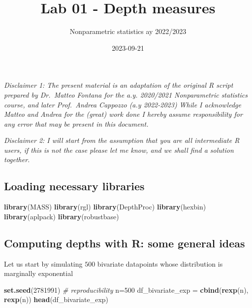 \documentclass[
]{article}
\title{Lab 01 - Depth measures}
\author{Nonparametric statistics ay 2022/2023}
\date{2023-09-21}
\newenvironment{Shaded}{\begin{snugshade}}{\end{snugshade}}
\newcommand{\CommentTok}[1]{\textcolor[rgb]{0.56,0.35,0.01}{\textit{#1}}}
\newcommand{\DecValTok}[1]{\textcolor[rgb]{0.00,0.00,0.81}{#1}}
\newcommand{\FunctionTok}[1]{\textcolor[rgb]{0.13,0.29,0.53}{\textbf{#1}}}
\newcommand{\NormalTok}[1]{#1}
\newcommand{\OtherTok}[1]{\textcolor[rgb]{0.56,0.35,0.01}{#1}}
\begin{document}
\maketitle

\emph{Disclaimer 1: The present material is an adaptation of the
original R script prepared by Dr.~Matteo Fontana for the a.y. 2020/2021
Nonparametric statistics course, and later Prof.~Andrea Cappozzo (a.y
2022-2023) While I acknowledge Matteo and Andrea for the (great) work
done I hereby assume responsibility for any error that may be present in
this document.}

\emph{Disclaimer 2: I will start from the assumption that you are all
intermediate R users, if this is not the case please let me know, and we
shall find a solution together.}

\hypertarget{loading-necessary-libraries}{%
\subsection{Loading necessary
libraries}\label{loading-necessary-libraries}}

\begin{Shaded}
\begin{Highlighting}[]
\FunctionTok{library}\NormalTok{(MASS)}
\FunctionTok{library}\NormalTok{(rgl)}
\FunctionTok{library}\NormalTok{(DepthProc)}
\FunctionTok{library}\NormalTok{(hexbin)}
\FunctionTok{library}\NormalTok{(aplpack)}
\FunctionTok{library}\NormalTok{(robustbase)}
\end{Highlighting}
\end{Shaded}

\hypertarget{computing-depths-with-r-some-general-ideas}{%
\subsection{Computing depths with R: some general
ideas}\label{computing-depths-with-r-some-general-ideas}}

Let us start by simulating \(500\) bivariate datapoints whose
distribution is marginally exponential

\begin{Shaded}
\begin{Highlighting}[]
\FunctionTok{set.seed}\NormalTok{(}\DecValTok{2781991}\NormalTok{) }\CommentTok{\# reproducibility}
\NormalTok{n}\OtherTok{=}\DecValTok{500}
\NormalTok{df\_bivariate\_exp }\OtherTok{=} \FunctionTok{cbind}\NormalTok{(}\FunctionTok{rexp}\NormalTok{(n), }\FunctionTok{rexp}\NormalTok{(n))}
\FunctionTok{head}\NormalTok{(df\_bivariate\_exp)}
\end{Highlighting}
\end{Shaded}
\end{document}
